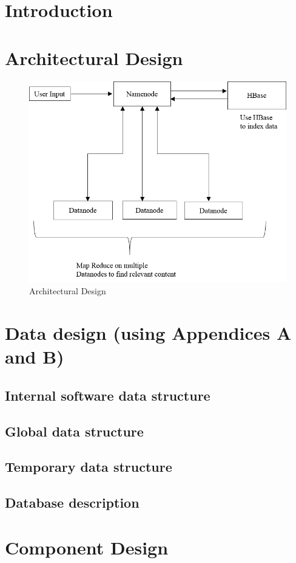 \documentclass[oneside,a4paper,12pt]{report}
\begin{document}
\section{Introduction}
\section{Architectural Design}
\begin{figure}[H]
\includegraphics{architecture_design}
\caption{Architectural Design}
\end{figure}

\section{Data design (using Appendices A and B)}
\subsection{Internal software data structure}
\subsection{Global data structure}
\subsection{Temporary data structure}
\subsection{Database description}
\section{Component Design}
\end{document}

